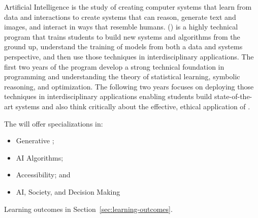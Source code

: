 Artificial Intelligence is the study of creating computer systems that
learn from data and interactions to create systems that can reason,
generate text and images, and interact in ways that resemble humans.
%
\name{} (\short{}) is a highly technical program that trains
students to build new \ai{} systems and algorithms from the ground up, understand the
training of models from both a data and systems perspective, and then
use those techniques in interdisciplinary applications.
%
The first two years of the program develop a strong technical
foundation in programming and understanding the theory of statistical
learning, symbolic reasoning, and optimization.
%
The following two years focuses on deploying those techniques in
interdisciplinary applications enabling students build state-of-the-art \ai{} systems and also think critically
about the effective, ethical application of \ai{}.

The \short{} will offer specializations in:
\begin{itemize}
    \item Generative \ai{};
    \item AI Algorithms;
    \item Accessibility; and
    \item AI, Society, and Decision Making      
    \end{itemize}

Learning outcomes in Section~\ref{sec:learning-outcomes}.